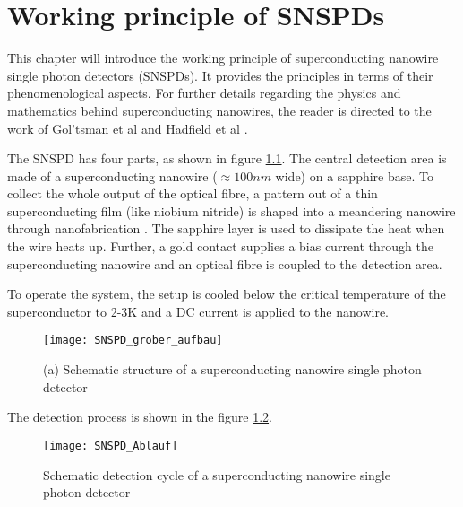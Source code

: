 \graphicspath{{/Users/maxim.re/Studium/Physik B.Sc./Semester_8_SS24/Proseminar/Figs Single Photon Detection/}}

\chapter{Working principle of SNSPDs}
\label{sec:SNSPD_working_principle}
This chapter will introduce the working principle of superconducting nanowire single photon detectors (SNSPDs).
It provides the principles in terms of their phenomenological aspects.
For further details regarding the physics and mathematics behind superconducting nanowires, the reader is directed
to the work of Gol’tsman et al \cite{goltsman-2001} and Hadfield et al \cite{natarajan-2012}.

The SNSPD has four parts, as shown in figure \ref{fig:SNSPD_rough_structure}.
The central detection area is made of a superconducting nanowire ($\approx 100nm$ wide) on a sapphire base.
To collect the whole output of the optical fibre, a pattern out of a
thin superconducting film (like niobium nitride) is shaped into a meandering nanowire through nanofabrication \cite{single-quantum-2022}.
The sapphire layer is used to dissipate the heat when the wire heats up.
Further, a gold contact supplies a bias current through the superconducting nanowire and an optical fibre is coupled to the detection area.

To operate the system, the setup is cooled below the critical temperature of the superconductor to
2-3K and a DC current is applied to the nanowire.

\begin{figure}[hhh]
    \centering
    \texttt{[image: SNSPD\_grober\_aufbau]}
    \caption{(a) Schematic structure of a superconducting nanowire single photon detector \cite{steudle-2012}}
    \label{fig:SNSPD_rough_structure}
\end{figure}

The detection process is shown in the figure \ref{fig: SNSPD_process}.

\begin{figure}[hhh]
    \centering
    \texttt{[image: SNSPD\_Ablauf]}
    \caption{Schematic detection cycle of a superconducting nanowire single photon detector \cite{singlequantum_snsd_nodate}}
    \label{fig: SNSPD_process}
\end{figure}

